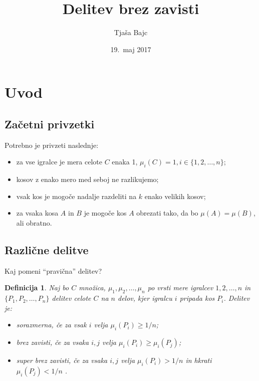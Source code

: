 \documentclass{beamer}
\title{Delitev brez zavisti}
\author{Tjaša Bajc}
\date{19.\ maj 2017}
\newtheorem{definicija}{Definicija}
\begin{document}

\begin{frame}
\titlepage
\end{frame}

\section{Uvod}
\subsection{Začetni privzetki}

\begin{frame}

Potrebno je privzeti naslednje:

\begin{itemize}
\item za vse igralce je mera celote $C$ enaka 1, $\mu_i(C) = 1, i \in \{1, 2, \ldots, n\}$;
\item kosov z enako mero med seboj ne razlikujemo; 
\item vsak kos je mogoče nadalje razdeliti na $k$ enako velikih kosov;
\item za vsaka kosa $A$ in $B$ je mogoče kos $A$ obrezati tako, da bo $\mu(A) = \mu(B)$, ali obratno.							
\end{itemize}

\end{frame}

\subsection{Različne delitve}
\begin{frame}

Kaj pomeni ``pravična'' delitev?

\begin{definicija}
Naj bo $C$ množica, $\mu_1, \mu_2, \ldots, \mu_n$ po vrsti mere igralcev $1, 2, \ldots, n$ in $\{P_1, P_2, \ldots, P_n\}$ delitev celote $C$ na $n$ delov, kjer igralcu $i$ pripada kos $P_i$. Delitev je:

\begin{itemize}
\item {\em sorazmerna\/}, če za vsak $i$ velja $\mu_i(P_i) \geq 1/n$;
\item {\em brez zavisti\/}, če za vsaka $i, j$ velja $\mu_i(P_i) \geq \mu_i(P_j)$;
\item{\em super brez zavisti\/}, če za vsaka $i, j$ velja $\mu_i(P_i) > 1/n$ in hkrati $\mu_i(P_j) < 1/n$ .								
\end{itemize}

\end{definicija}

\end{frame}
\end{document}
